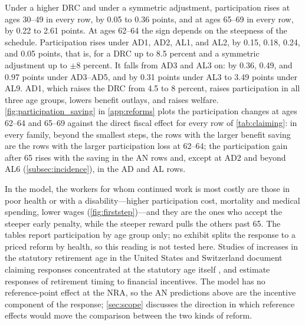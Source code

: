 Under a higher DRC and under a symmetric adjustment, participation rises at ages 30--49 in every row, by 0.05 to 0.36 points, and at ages 65--69 in every row, by 0.22 to 2.61 points. %
At ages 62--64 the sign depends on the steepness of the schedule. Participation rises under AD1, AD2, AL1, and AL2, by 0.15, 0.18, 0.24, and 0.05 points, that is, for a DRC up to 8.5 percent and a symmetric adjustment up to $\pm 8$ percent. %
It falls from AD3 and AL3 on: by 0.36, 0.49, and 0.97 points under AD3--AD5, and by 0.31 points under AL3 to 3.49 points under AL9. %
AD1, which raises the DRC from 4.5 to 8 percent, raises participation in all three age groups, lowers benefit outlays, and raises welfare. %
\autoref{fig:participation_saving} in \autoref{app:reforms} plots the participation changes at ages 62--64 and 65--69 against the direct fiscal effect for every row of \autoref{tab:claiming}: in every family, beyond the smallest steps, the rows with the larger benefit saving are the rows with the larger participation loss at 62--64; the participation gain after 65 rises with the saving in the AN rows and, except at AD2 and beyond AL6 (\autoref{subsec:incidence}), in the AD and AL rows.

In the model, the workers for whom continued work is most costly are those in poor health or with a disability---higher participation cost, mortality and medical spending, lower wages (\autoref{fig:firststep})---and they are the ones who accept the steeper early penalty, while the steeper reward pulls the others past 65. %
The tables report participation by age group only; no exhibit splits the response to a priced reform by health, so this reading is not tested here.
Studies of increases in the statutory retirement age in the United States and Switzerland document claiming responses concentrated at the statutory age itself \citep{mastrobuoni2009labor,behagel2012,deshpande2024sticky,lalive2023social}, and \citet{manoli2016nonparametric} estimate responses of retirement timing to financial incentives. The model has no reference-point effect at the NRA, so the AN predictions above are the incentive component of the response; \autoref{sec:scope} discusses the direction in which reference effects would move the comparison between the two kinds of reform.

